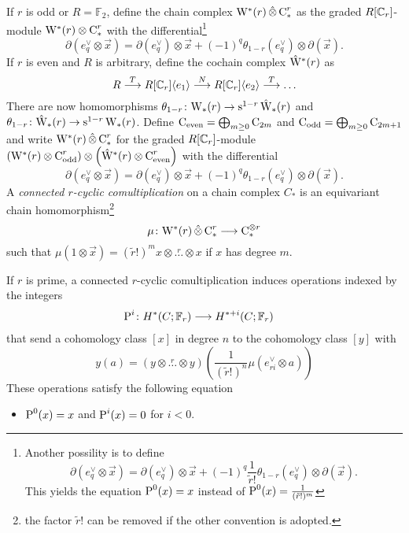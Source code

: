 If $r$ is odd or $R=\mathbb{F}_2$, define the chain complex $\mathrm{W}^*(r)\operatorname{\hat{\otimes}} \operatorname{C}_*^r$ as the graded $R[\mathbb{C}_r]$-module $\mathrm{W}^*(r)\otimes \operatorname{C}_*^r$ with the differential\footnote{Another possility is to define 
\[
    \partial(e^\vee_q\otimes \vec{x}) = \partial (e^\vee_q)\otimes \vec{x} + (-1)^q \frac{1}{\tilde{r}!}\theta_{1-r}(e^\vee_q)\otimes \partial (\vec{x}).
\]
This yields the equation $\operatorname{P}^0(x) = x$ instead of $\operatorname{P}^0(x) = \frac{1}{(\tilde{r}!)^m}$
}
\[
    \partial(e^\vee_q\otimes \vec{x}) = \partial (e^\vee_q)\otimes \vec{x} + (-1)^q \theta_{1-r}(e^\vee_q)\otimes \partial (\vec{x}).
\]
If $r$ is even and $R$ is arbitrary, define the cochain complex $\hat{\mathrm{W}}^*(r)$ as
\[
    R\overset{T}{\longrightarrow} R[\mathbb{C}_r]\langle e_1\rangle \overset{N}{\longrightarrow} R[\mathbb{C}_r]\langle e_2\rangle \overset{T}{\longrightarrow}\ldots
\]
There are now homomorphisms $\theta_{1-r}\colon \mathrm{W}_*(r)\to \operatorname{s}^{1-r}\hat{\mathrm{W}}_*(r)$ and $\theta_{1-r}\colon \hat{\mathrm{W}}_*(r)\to \operatorname{s}^{1-r}\mathrm{W}_*(r)$. Define $\operatorname{C}_{\mathrm{even}} = \bigoplus_{m\geq 0}\operatorname{C}_{2m}$ and $\operatorname{C}_{\mathrm{odd}} = \bigoplus_{m\geq 0}\operatorname{C}_{2m+1}$ and write $\mathrm{W}^*(r)\operatorname{\hat{\otimes}} \operatorname{C}_*^r$ for the graded $R[\mathbb{C}_r]$-module $\left(\mathrm{W}^*(r)\otimes \operatorname{C}_{\mathrm{odd}}^r\right)\otimes \left(\hat{\mathrm{W}}^*(r)\otimes \operatorname{C}_{\mathrm{even}}^r\right)$ with the differential
\[
    \partial(e^\vee_q\otimes \vec{x}) = \partial (e^\vee_q)\otimes \vec{x} + (-1)^q \theta_{1-r}(e^\vee_q)\otimes \partial (\vec{x}).
\]
    A \emph{connected $r$-cyclic comultiplication} on a chain complex $C_*$ is an equivariant chain homomorphism\footnote{the factor $\tilde{r}!$ can be removed if the other convention is adopted.}
    \[
        \mu\colon \mathrm{W}^*(r)\operatorname{\hat{\otimes}} \operatorname{C}^r_*\longrightarrow \operatorname{C}_*^{\otimes r}
    \]
    such that $\mu(1 \otimes \vec{x}) = (\tilde{r}!)^{m}x\otimes\overset{r}{\ldots}\otimes x$ if $x$ has degree $m$.
\begin{proposition}
    If $r$ is prime, a connected $r$-cyclic comultiplication induces operations indexed by the integers
    \begin{align*}
        \operatorname{P}^{i}\colon H^*(C;\mathbb{F}_r)&\longrightarrow H^{*+i}(C;\mathbb{F}_r)
    \end{align*}
    that send a cohomology class $[x]$ in degree $n$ to the cohomology class $[y]$ with
    \[
        y(a) = (y\otimes \overset{r}{\ldots}\otimes y)(\frac{1}{(\tilde{r}!)^n}\mu(e_{ri}^\vee\otimes a))
    \]
    These operations satisfy the following equation
\begin{itemize}
    \item $\operatorname{P}^0(x) = x$ and $\operatorname{P}^i(x) = 0$ for $i<0$.
\end{itemize}
\end{proposition}
